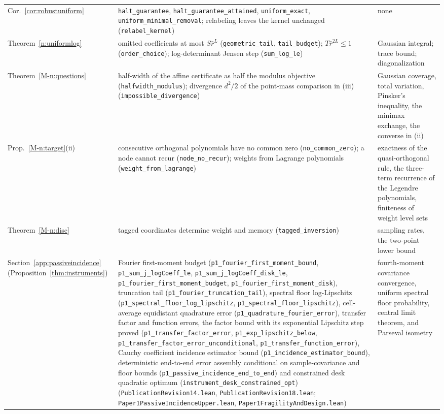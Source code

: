 \documentclass[12pt]{article}
\theoremstyle{definition}
\theoremstyle{remark}
\begin{document}
{\begin{longtable}{>{\raggedright\arraybackslash}p{}>{\raggedright\arraybackslash}p{}>{\raggedright\arraybackslash}p{}}
Cor.~\ref{cor:robustuniform} & \texttt{halt\_guarantee}, \texttt{halt\_guarantee\_attained}, \texttt{uniform\_exact}, \texttt{uniform\_minimal\_removal}; relabeling leaves the kernel unchanged (\texttt{relabel\_kernel}) & none\\
Theorem~\ref{n:uniformlog} & omitted coefficients at most $S\bar r^{L}$ (\texttt{geometric\_tail}, \texttt{tail\_budget}); $T\bar r^{2L}\le1$ (\texttt{order\_choice}); log-determinant Jensen step (\texttt{sum\_log\_le}) & Gaussian integral; trace bound; diagonalization\\
Theorem~\ref{M-n:questions} & half-width of the affine certificate as half the modulus objective (\nolinkurl{halfwidth_modulus}); divergence $d^2/2$ of the point-mass comparison in (iii) (\nolinkurl{impossible_divergence}) & Gaussian coverage, total variation, Pinsker's inequality, the minimax exchange, the converse in (ii)\\
Prop.~\ref{M-n:target}(ii) & consecutive orthogonal polynomials have no common zero (\nolinkurl{no_common_zero}); a node cannot recur (\nolinkurl{node_no_recur}); weights from Lagrange polynomials (\nolinkurl{weight_from_lagrange}) & exactness of the quasi-orthogonal rule, the three-term recurrence of the Legendre polynomials, finiteness of weight level sets\\
Theorem~\ref{M-n:disc} & tagged coordinates determine weight and memory (\nolinkurl{tagged_inversion}) & sampling rates, the two-point lower bound\\
Section~\ref{app:passiveincidence} (Proposition~\ref{thm:instruments}) & Fourier first-moment budget (\texttt{p1\_fourier\_first\_moment\_bound}, \texttt{p1\_sum\_j\_logCoeff\_le}, \texttt{p1\_sum\_j\_logCoeff\_disk\_le}, \texttt{p1\_fourier\_first\_moment\_budget}, \texttt{p1\_fourier\_first\_moment\_disk}), truncation tail (\texttt{p1\_fourier\_truncation\_tail}), spectral floor log-Lipschitz (\texttt{p1\_spectral\_floor\_log\_lipschitz}, \texttt{p1\_spectral\_floor\_lipschitz}), cell-average equidistant quadrature error (\texttt{p1\_quadrature\_fourier\_error}), transfer factor and function errors, the factor bound with its exponential Lipschitz step proved (\texttt{p1\_transfer\_factor\_error}, \texttt{p1\_exp\_lipschitz\_below}, \texttt{p1\_transfer\_factor\_error\_unconditional}, \texttt{p1\_transfer\_function\_error}), Cauchy coefficient incidence estimator bound (\texttt{p1\_incidence\_estimator\_bound}), deterministic end-to-end error assembly conditional on sample-covariance and floor bounds (\texttt{p1\_passive\_incidence\_end\_to\_end}) and constrained desk quadratic optimum (\texttt{instrument\_desk\_constrained\_opt}) (\nolinkurl{PublicationRevision14.lean}, \nolinkurl{PublicationRevision18.lean}; \nolinkurl{Paper1PassiveIncidenceUpper.lean}, \nolinkurl{Paper1FragilityAndDesign.lean}) & fourth-moment covariance convergence, uniform spectral floor probability, central limit theorem, and Parseval isometry\\

\end{longtable}}
\end{document}

